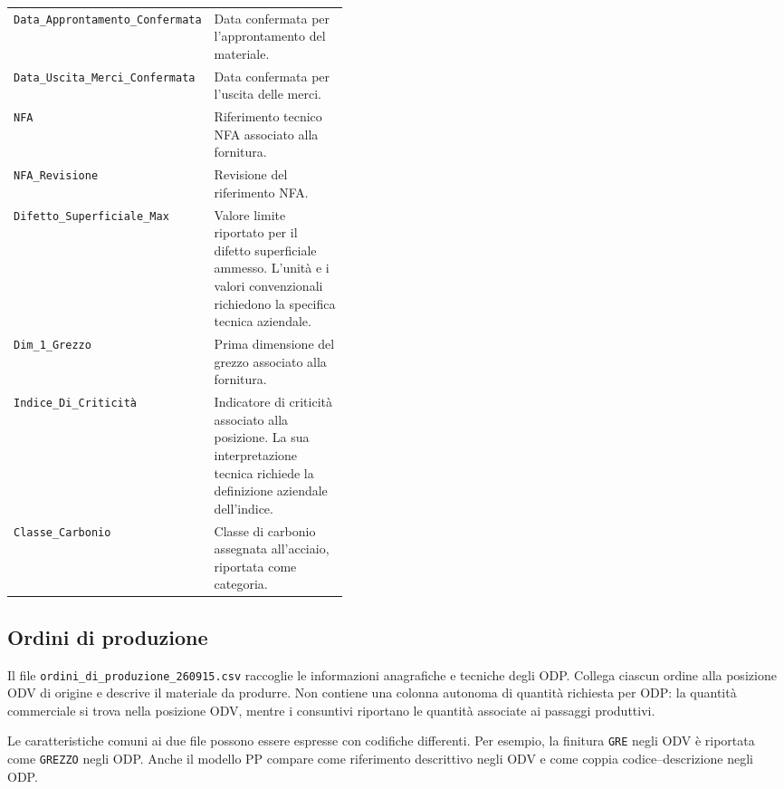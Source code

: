 \begin{longtable}{@{}p{0.43\linewidth}p{}@{}}
\texttt{Data\_Approntamento\_Confermata} & Data confermata per l'approntamento del materiale. \\
\texttt{Data\_Uscita\_Merci\_Confermata} & Data confermata per l'uscita delle merci. \\
\texttt{NFA} & Riferimento tecnico NFA associato alla fornitura. \\
\texttt{NFA\_Revisione} & Revisione del riferimento NFA. \\
\texttt{Difetto\_Superficiale\_Max} & Valore limite riportato per il difetto superficiale ammesso. L'unità e i valori convenzionali richiedono la specifica tecnica aziendale. \\
\texttt{Dim\_1\_Grezzo} & Prima dimensione del grezzo associato alla fornitura. \\
\texttt{Indice\_Di\_Criticità} & Indicatore di criticità associato alla posizione. La sua interpretazione tecnica richiede la definizione aziendale dell'indice. \\
\texttt{Classe\_Carbonio} & Classe di carbonio assegnata all'acciaio, riportata come categoria. \\
\end{longtable}
\endgroup

\subsection{Ordini di produzione}
\label{sec:production-order-data}

Il file \nolinkurl{ordini_di_produzione_260915.csv} raccoglie le informazioni anagrafiche e tecniche degli ODP. Collega ciascun ordine alla posizione ODV di origine e descrive il materiale da produrre. Non contiene una colonna autonoma di quantità richiesta per ODP: la quantità commerciale si trova nella posizione ODV, mentre i consuntivi riportano le quantità associate ai passaggi produttivi.

Le caratteristiche comuni ai due file possono essere espresse con codifiche differenti. Per esempio, la finitura \texttt{GRE} negli ODV è riportata come \texttt{GREZZO} negli ODP. Anche il modello PP compare come riferimento descrittivo negli ODV e come coppia codice--descrizione negli ODP.


